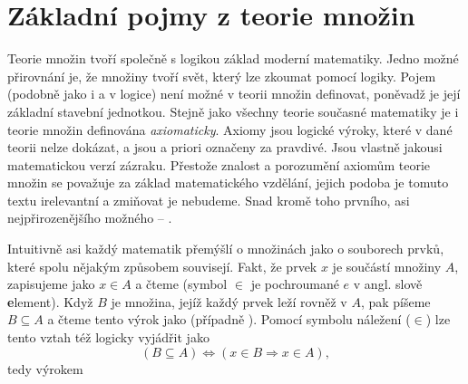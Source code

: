 \section{Základní pojmy z teorie množin}
\label{sec:zakladni-pojmy-z-teorie-mnozin}

Teorie množin tvoří společně s logikou základ moderní matematiky. Jedno možné
přirovnání je, že množiny tvoří svět, který lze zkoumat pomocí logiky. Pojem
 (podobně jako i  a  v logice) není možné v
teorii množin definovat, poněvadž je její základní stavební jednotkou. Stejně
jako všechny teorie současné matematiky je i teorie množin definována
\emph{axiomaticky}. Axiomy jsou logické výroky, které v dané teorii nelze
dokázat, a jsou a priori označeny za pravdivé. Jsou vlastně jakousi matematickou
verzí zázraku. Přestože znalost a porozumění axiomům teorie množin se považuje
za základ matematického vzdělání, jejich podoba je tomuto textu irelevantní a
zmiňovat je nebudeme. Snad kromě toho prvního, asi nejpřirozenějšího možného --
.

Intuitivně asi každý matematik přemýšlí o množinách jako o souborech prvků,
které spolu nějakým způsobem souvisejí. Fakt, že prvek $x$ je součástí množiny
$A$, zapisujeme jako $x \in A$ a čteme  (symbol $
\in $ je pochroumané $e$ v angl. slově \textbf{e}lement). Když $B$ je množina,
jejíž každý prvek leží rovněž v $A$, pak píšeme $B \subseteq A$ a čteme tento
výrok jako  (případně ).
Pomocí symbolu náležení ($ \in $) lze tento vztah též logicky vyjádřit jako
\[
 (B \subseteq A) \Leftrightarrow (x \in B \Rightarrow x \in A),
\]
tedy výrokem 

